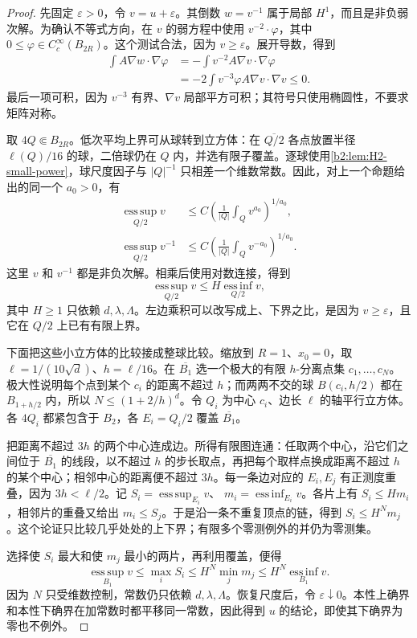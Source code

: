 \begin{proof}
先固定 \(\varepsilon>0\)，令 \(v=u+\varepsilon\)。其倒数 \(w=v^{-1}\) 属于局部 \(H^1\)，而且是非负弱次解。为确认不等式方向，在 \(v\) 的弱方程中使用
\(v^{-2}\cdot\varphi\)，其中 \(0\leq\varphi\in C_c^\infty(B_{2R})\)。这个测试合法，因为 \(v\geq\varepsilon\)。展开导数，得到
\[
 \begin{aligned}
 \int A\nabla w\cdot\nabla\varphi
 &=-\int v^{-2}A\nabla v\cdot\nabla\varphi\\
 &=-2\int v^{-3}\varphi A\nabla v\cdot\nabla v\leq0.
 \end{aligned}
\]
最后一项可积，因为 \(v^{-3}\) 有界、\(\nabla v\) 局部平方可积；其符号只使用椭圆性，不要求矩阵对称。

取 \(4Q\Subset B_{2R}\)。低次平均上界可从球转到立方体：在 \(\overline{Q/2}\) 各点放置半径 \(\ell(Q)/16\) 的球，二倍球仍在 \(Q\) 内，并选有限子覆盖。逐球使用\cref{b2:lem:H2-small-power}，球尺度因子与 \(|Q|^{-1}\) 只相差一个维数常数。因此，对上一个命题给出的同一个 \(a_0>0\)，有
\[
 \begin{aligned}
 \operatorname*{ess\,sup}_{Q/2}v
 &\leq C\left(\frac1{|Q|}\int_Qv^{a_0}\right)^{1/a_0},\\
 \operatorname*{ess\,sup}_{Q/2}v^{-1}
 &\leq C\left(\frac1{|Q|}\int_Qv^{-a_0}\right)^{1/a_0}.
 \end{aligned}
\]
这里 \(v\) 和 \(v^{-1}\) 都是非负次解。相乘后使用对数连接，得到
\[
 \operatorname*{ess\,sup}_{Q/2}v
 \leq H\operatorname*{ess\,inf}_{Q/2}v,
\]
其中 \(H\geq1\) 只依赖 \(d,\lambda,\Lambda\)。左边乘积可以改写成上、下界之比，是因为 \(v\geq\varepsilon\)，且它在 \(Q/2\) 上已有有限上界。

下面把这些小立方体的比较接成整球比较。缩放到 \(R=1\)、\(x_0=0\)，取
\(\ell=1/(10\sqrt d)\)、\(h=\ell/16\)。在 \(\overline{B_1}\) 选一个极大的有限 \(h\)-分离点集 \(c_1,\ldots,c_N\)。极大性说明每个点到某个 \(c_i\) 的距离不超过 \(h\)；而两两不交的球 \(B(c_i,h/2)\) 都在 \(B_{1+h/2}\) 内，所以
\(N\leq(1+2/h)^d\)。令 \(Q_i\) 为中心 \(c_i\)、边长 \(\ell\) 的轴平行立方体。各 \(4Q_i\) 都紧包含于 \(B_2\)，各 \(E_i=Q_i/2\) 覆盖 \(\overline{B_1}\)。

把距离不超过 \(3h\) 的两个中心连成边。所得有限图连通：任取两个中心，沿它们之间位于 \(\overline{B_1}\) 的线段，以不超过 \(h\) 的步长取点，再把每个取样点换成距离不超过 \(h\) 的某个中心；相邻中心的距离便不超过 \(3h\)。每一条边对应的 \(E_i,E_j\) 有正测度重叠，因为
\(3h<\ell/2\)。记
\(S_i=\operatorname*{ess\,sup}_{E_i}v\)、
\(m_i=\operatorname*{ess\,inf}_{E_i}v\)。各片上有 \(S_i\leq Hm_i\)，相邻片的重叠又给出 \(m_i\leq S_j\)。于是沿一条不重复顶点的链，得到
\(S_i\leq H^Nm_j\)。这个论证只比较几乎处处的上下界；有限多个零测例外的并仍为零测集。

选择使 \(S_i\) 最大和使 \(m_j\) 最小的两片，再利用覆盖，便得
\[
 \operatorname*{ess\,sup}_{B_1}v
 \leq\max_iS_i
 \leq H^N\min_jm_j
 \leq H^N\operatorname*{ess\,inf}_{B_1}v.
\]
因为 \(N\) 只受维数控制，常数仍只依赖 \(d,\lambda,\Lambda\)。恢复尺度后，令 \(\varepsilon\downarrow0\)。本性上确界和本性下确界在加常数时都平移同一常数，因此得到 \(u\) 的结论，即使其下确界为零也不例外。
\end{proof}


